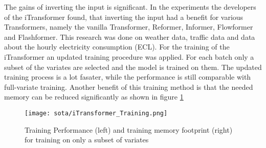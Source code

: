 \documentclass[class=scrbook, crop=false]{standalone}
\begin{document}
The gains of inverting the input is significant. In the experiments the developers of the iTransformer found, that inverting the input had a benefit for various Transformers, namely the vanilla Transformer, Reformer, Informer, Flowformer and Flashformer. 
This research was done on weather data, traffic data and data about the hourly electricity consumption (ECL).
For the training of the iTransformer an updated training procedure was applied. 
For each batch only a subset of the variates are selected and the model is trained on them. 
The updated training process is a lot fasater, while the performance is still comparable with full-variate training. 
Another benefit of this training method is that the needed memory can be reduced significantly as shown in figure \ref{fig::iTransformer_Training} \cite{liuITransformerInvertedTransformers2023}

\begin{figure}[ht]
            \centering
            \texttt{[image: sota/iTransformer\_Training.png]}
            \caption[Training Performance (left) and training memory footprint (right) for training on only a subset of variates \cite{liuITransformerInvertedTransformers2023}]{Training Performance (left) and training memory footprint (right) for training on only a subset of variates \cite{liuITransformerInvertedTransformers2023}}
            \label{fig::iTransformer_Training}
 \end{figure}
\end{document}

